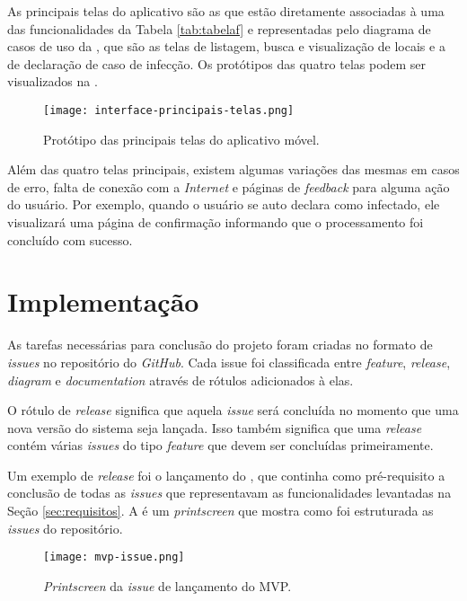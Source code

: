 As principais telas do aplicativo são as que estão diretamente associadas à uma das funcionalidades da Tabela \ref{tab:tabelaf} e representadas pelo diagrama de casos de uso da , que são as telas de listagem, busca e visualização de locais e a de declaração de caso de infecção. Os protótipos das quatro telas podem ser visualizados na .

\begin{figure}[!htb]
  \centering
  \texttt{[image: interface-principais-telas.png]}
  \caption{Protótipo das principais telas do aplicativo móvel.}
  \label{fig:principaistelas}
\end{figure}

Além das quatro telas principais, existem algumas variações das mesmas em casos de erro, falta de conexão com a \textit{Internet} e páginas de \textit{feedback} para alguma ação do usuário. Por exemplo, quando o usuário se auto declara como infectado, ele visualizará uma página de confirmação informando que o processamento foi concluído com sucesso.

\section{Implementação}\label{sec:implementacao}

As tarefas necessárias para conclusão do projeto foram criadas no formato de \textit{issues} no repositório do \textit{GitHub}. Cada issue foi classificada entre \textit{feature}, \textit{release}, \textit{diagram} e \textit{documentation} através de rótulos adicionados à elas.

O rótulo de \textit{release} significa que aquela \textit{issue} será concluída no momento que uma nova versão do sistema seja lançada. Isso também significa que uma \textit{release} contém várias \textit{issues} do tipo \textit{feature} que devem ser concluídas primeiramente.

Um exemplo de \textit{release} foi o lançamento do , que continha como pré-requisito a conclusão de todas as \textit{issues} que representavam as funcionalidades levantadas na Seção \ref{sec:requisitos}. A  é um \textit{printscreen} que mostra como foi estruturada as \textit{issues} do repositório.

\begin{figure}[!htb]
  \centering
  \texttt{[image: mvp-issue.png]}
  \caption{\textit{Printscreen} da \textit{issue} de lançamento do MVP.}
  \label{fig:issuemvp}
\end{figure}


